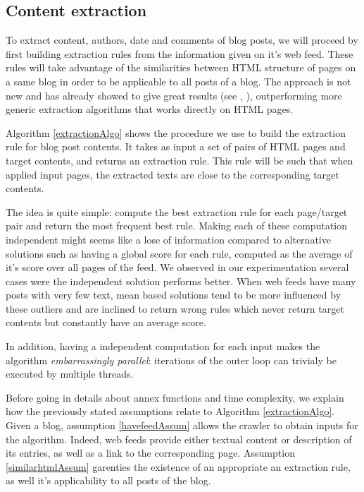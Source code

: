 \subsection{Content extraction}
To extract content, authors, date and comments of blog posts, we will proceed by first building extraction rules from the information given on it's web feed. These rules will take advantage of the similarities between HTML structure of pages on a same blog in order to be applicable to all posts of a blog. The approach is not new and has already showed to give great results (see \cite{gkotsis2013}, \cite{oita2010}), outperforming more generic extraction algorithms that works directly on HTML pages.

\extractionAlgo

Algorithm \ref{extractionAlgo} shows the procedure we use to build the extraction rule for blog post contents. It takes as input a set of pairs of HTML pages and target contents, and returns an extraction rule. This rule will be such that when applied input pages, the extracted texts are close to the corresponding target contents. %

The idea is quite simple: compute the best extraction rule for each page/target pair and return the most frequent best rule. Making each of these computation independent might seems like a lose of information compared to alternative solutions such as having a global score for each rule, computed as the average of it's score over all pages of the feed. We observed in our experimentation several cases were the independent solution performs better. When web feeds have many posts with very few text, mean based solutions tend to be more influenced by these outliers and are inclined to return wrong rules which never return target contents but constantly have an average score.

In addition, having a independent computation for each input makes the algorithm \emph{embarrassingly parallel}: iterations of the outer loop can trivialy be executed by multiple threads.

Before going in details about annex functions and time complexity, we explain how the previously stated assumptions relate to Algorithm \ref{extractionAlgo}. Given a blog, assumption \ref{havefeedAssum} allows the crawler to obtain inputs for the algorithm. Indeed, web feeds provide either textual content or description of its entries, as well as a link to the corresponding page. Assumption \ref{similarhtmlAssum} garenties the existence of an appropriate an extraction rule, as well it's applicability to all posts of the blog.


